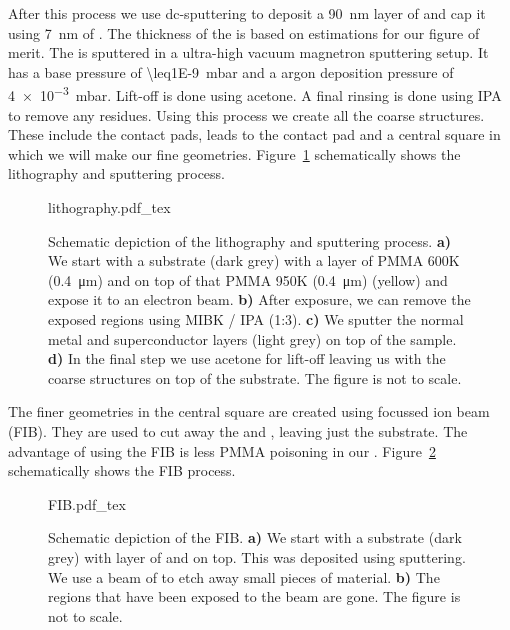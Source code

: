 After this process we use dc-sputtering to deposit a \qty{90}{\nano\meter} layer of  and cap it using \qty{7}{\nano\meter} of . The thickness of the  is based on estimations for our figure of merit. The  is sputtered in a ultra-high vacuum magnetron sputtering setup. It has a base pressure of \qty{\leq1E-9}{\milli\bar} and a argon deposition pressure of \qty{4e-3}{\milli\bar}. Lift-off is done using acetone. A final rinsing is done using IPA to remove any residues. Using this process we create all the coarse structures. These include the contact pads, leads to the contact pad and a central square in which we will make our fine geometries. Figure~\ref{fig:lithography} schematically shows the lithography and sputtering process.

\begin{figure}[ht!]
	\centering
	\def\svgwidth{\textwidth}
	{lithography.pdf_tex}
	\caption{Schematic depiction of the lithography and sputtering process. \textbf{a)} We start with a  substrate (dark grey) with a layer of PMMA 600K (\qty{0.4}{\micro\meter}) and on top of that PMMA 950K (\qty{0.4}{\micro\meter}) (yellow) and expose it to an electron beam. \textbf{b)} After exposure, we can remove the exposed regions using MIBK / IPA (1:3). \textbf{c)} We sputter the normal metal and superconductor layers (light grey) on top of the sample. \textbf{d)} In the final step we use acetone for lift-off leaving us with the coarse structures on top of the substrate. The figure is not to scale.}
	\label{fig:lithography}
\end{figure}

The finer geometries in the central square are created using focussed ion beam (FIB). They are used to cut away the  and , leaving just the substrate. The advantage of using the FIB is less PMMA poisoning in our . Figure~\ref{fig:FIB} schematically shows the FIB process.

\begin{figure}[ht!]
	\centering
	\def\svgwidth{0.5\textwidth}
	{FIB.pdf_tex}
	\caption{Schematic depiction of the FIB. \textbf{a)} We start with a  substrate (dark grey) with layer of  and  on top. This was deposited using sputtering. We use a beam of  to etch away small pieces of material. \textbf{b)} The regions that have been exposed to the  beam are gone. The figure is not to scale.}
	\label{fig:FIB}
\end{figure}